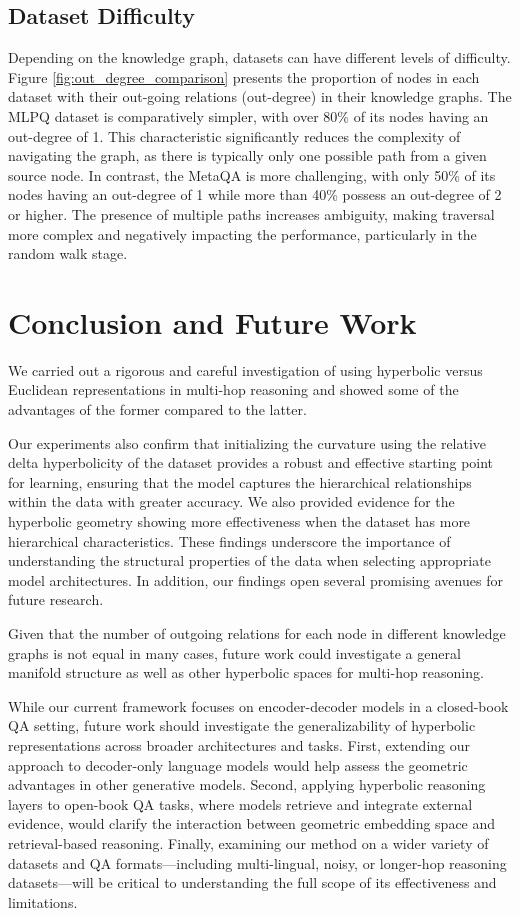 \documentclass[11pt]{article}
\begin{document}
\subsection{Dataset Difficulty}
Depending on the knowledge graph, datasets can have different levels of difficulty. Figure \ref{fig:out_degree_comparison} presents the proportion of nodes in each dataset with their out-going relations (out-degree) in their knowledge graphs. The MLPQ dataset is comparatively simpler, with over 80\% of its nodes having an out-degree of 1. This characteristic significantly reduces the complexity of navigating the graph, as there is typically only one possible path from a given source node. In contrast, the MetaQA is more challenging, with only 50\% of its nodes having an out-degree of 1 while more than 40\% possess an out-degree of 2 or higher. The presence of multiple paths increases ambiguity, making traversal more complex and negatively impacting the performance, particularly in the random walk stage.


\section{Conclusion and Future Work}

We carried out a rigorous and careful investigation of using hyperbolic versus Euclidean representations in multi-hop reasoning and showed some of the advantages of the former compared to the latter. 

Our experiments also confirm that initializing the curvature using the relative delta hyperbolicity of the dataset provides a robust and effective starting point for learning, ensuring that the model captures the hierarchical relationships within the data with greater accuracy. We also provided evidence for the hyperbolic geometry showing more effectiveness when the dataset has more hierarchical characteristics. These findings underscore the importance of understanding the structural properties of the data when selecting appropriate model architectures. In addition, our findings open several promising avenues for future research. 

Given that the number of outgoing relations for each node in different knowledge graphs is not equal in many cases, future work could investigate a general manifold structure as well as other hyperbolic spaces for multi-hop reasoning. 

While our current framework focuses on encoder-decoder models in a closed-book QA setting, future work should investigate the generalizability of hyperbolic representations across broader architectures and tasks. First, extending our approach to decoder-only language models would help assess the geometric advantages in other generative models. Second, applying hyperbolic reasoning layers to open-book QA tasks, where models retrieve and integrate external evidence, would clarify the interaction between geometric embedding space and retrieval-based reasoning. Finally, examining our method on a wider variety of datasets and QA formats—including multi-lingual, noisy, or longer-hop reasoning datasets—will be critical to understanding the full scope of its effectiveness and limitations.
\end{document}
